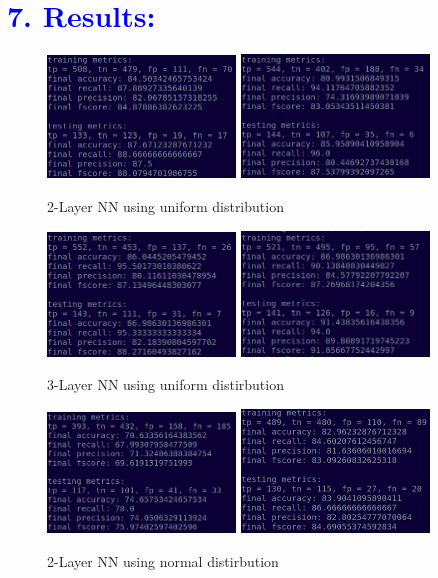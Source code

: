 \documentclass[a4paper,10pt,twocolumn]{article}
\begin{document}
\section*{\textcolor{blue}{7. Results:}}
\begin{figure}[h!]
\centering
\includegraphics[scale=1.0, width=5cm]{Fig1.png}
\includegraphics[scale=1.0, width=5cm]{Fig2.png}
\caption*{2-Layer NN using uniform distribution}
\end{figure}

\begin{figure}[h!]
\centering
\includegraphics[scale=1.0, width=5cm]{Fig3.png}
\includegraphics[scale=1.0, width=5cm]{Fig4.png}
\caption*{3-Layer NN using uniform distirbution}
\end{figure}

\begin{figure}[h!]
\centering
\includegraphics[scale=1.0, width=5cm]{Fig5.png}
\includegraphics[scale=1.0, width=5cm]{Fig6.png}
\caption*{2-Layer NN using normal distirbution}
\end{figure}
\end{document}
